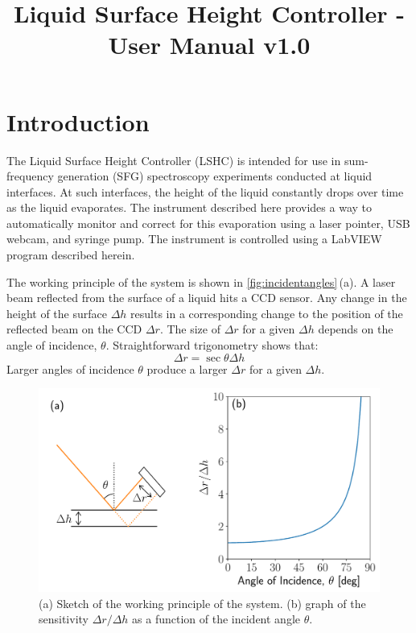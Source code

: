 \documentclass[11pt,a4paper,twoside]{article}
\begin{document}
\title{Liquid Surface Height Controller - User Manual v1.0}
\maketitle

\tableofcontents
\section{Introduction}
The Liquid Surface Height Controller (LSHC) is intended for use in sum-frequency generation (SFG) spectroscopy experiments conducted at liquid interfaces. At such interfaces, the height of the liquid constantly drops over time as the liquid evaporates. The instrument described here provides a way to automatically monitor and correct for this evaporation using a laser pointer, USB webcam, and syringe pump. The instrument is controlled using a LabVIEW program described herein.

The working principle of the system is shown in \autoref{fig:incidentangles}\,(a). A laser beam reflected from the surface of a liquid hits a CCD sensor. Any change in the height of the surface $\Delta h$ results in a corresponding change to the position of the reflected beam on the CCD $\Delta r$. The size of $\Delta r$ for a given $\Delta h$ depends on the angle of incidence, $\theta$. Straightforward trigonometry shows that:
\begin{equation}\label{eq:angle}
\Delta r = \sec \theta \Delta h
\end{equation}
Larger angles of incidence $\theta$ produce a larger $\Delta r$ for a given $\Delta h$.

\begin{figure}
\centering
\includegraphics[width=\textwidth]{incident_angles.pdf}
\caption{(a) Sketch of the working principle of the system. (b) graph of the sensitivity $\Delta r /\Delta h$ as a function of the incident angle $\theta$.}\label{fig:incidentangles}
\end{figure}
\end{document}
